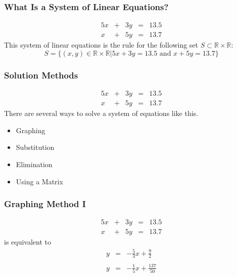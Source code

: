 \documentclass[xcolor=dvipsnames]{beamer}
\begin{document}
\begin{frame}
  \frametitle{What Is a System of Linear Equations?}
  \begin{equation}
    \label{eq:xaigeeke}
    \begin{array}{rcrcl}
      5x&+&3y&=&13.5 \\
      x&+&5y&=&13.7
    \end{array}
  \end{equation}
  This system of linear equations is the rule for the following set $S\subset\mathbb{R}\times\mathbb{R}$:
  \begin{equation}
    \label{eq:ahshohwa}
S=\{(x,y)\in\mathbb{R}\times\mathbb{R}|5x+3y=13.5\mbox{ and }x+5y=13.7\}
  \end{equation}
\end{frame}

\begin{frame}
  \frametitle{Solution Methods}
  \begin{equation}
    \label{eq:yeghahpi}
    \begin{array}{rcrcl}
      5x&+&3y&=&13.5 \\
      x&+&5y&=&13.7
    \end{array}
  \end{equation}
There are several ways to solve a system of equations like this. 
\begin{itemize}
\item Graphing
\item Substitution
\item Elimination
\item Using a Matrix
\end{itemize}
\end{frame}

\begin{frame}
  \frametitle{Graphing Method I}
  \begin{equation}
    \label{eq:oamaiwei}
    \begin{array}{rcrcl}
      5x&+&3y&=&13.5 \\
      x&+&5y&=&13.7
    \end{array}
  \end{equation}
is equivalent to
  \begin{equation}
    \label{eq:kaiquaeb}
    \begin{array}{rcl}
      y&=&-\frac{5}{3}x+\frac{9}{2} \\
      && \\
      y&=&-\frac{1}{5}x+\frac{137}{50}
    \end{array}
  \end{equation}
\end{frame}
\end{document}
